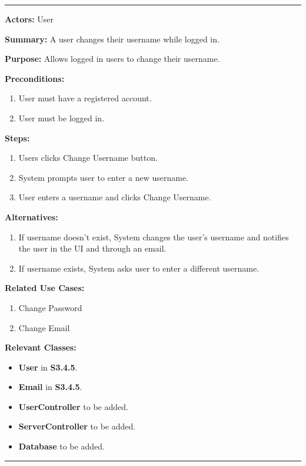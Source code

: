 \documentclass[twoside,letterpaper]{article}
\begin{document}
\hrule
\vspace{8pt}
\noindent\textbf{Actors:} User \newline

\noindent\textbf{Summary:} A user changes their username while logged in.  \newline

\noindent\textbf{Purpose:} Allows logged in users to change their username.  \newline

\noindent\textbf{Preconditions:}
\begin{enumerate}
	\item User must have a registered account.
	\item User must be logged in.
\end{enumerate}

\noindent\textbf{Steps:}
\begin{enumerate}
	\item Users clicks Change Username button.
	\item System prompts user to enter a new username.
	\item User enters a username and clicks Change Username.
\end{enumerate}

\noindent\textbf{Alternatives:}
\begin{enumerate}
	\item If username doesn't exist, System changes the user's username and notifies the user in the UI and through an email.
	\item If username exists, System asks user to enter a different username.
\end{enumerate}

\noindent\textbf{Related Use Cases:}
\begin{enumerate}
	\item Change Password
	\item Change Email
\end{enumerate}

\noindent\textbf{Relevant Classes:}
\begin{itemize}
	\item \textbf{User} in \textbf{S3.4.5}.
	\item \textbf{Email} in \textbf{S3.4.5}.
	\item \textbf{UserController} to be added.
	\item \textbf{ServerController} to be added.
	\item \textbf{Database} to be added.
\end{itemize}
\vspace{8pt}
\hrule
\newpage
\end{document}
